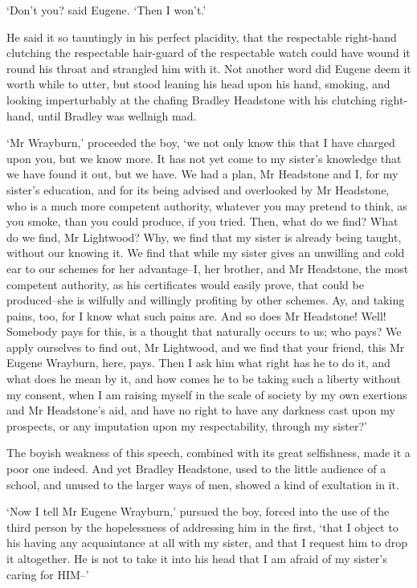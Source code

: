 ‘Don’t you? said Eugene. ‘Then I won’t.’

He said it so tauntingly in his perfect placidity, that the respectable
right-hand clutching the respectable hair-guard of the respectable watch
could have wound it round his throat and strangled him with it. Not
another word did Eugene deem it worth while to utter, but stood leaning
his head upon his hand, smoking, and looking imperturbably at the
chafing Bradley Headstone with his clutching right-hand, until Bradley
was wellnigh mad.

‘Mr Wrayburn,’ proceeded the boy, ‘we not only know this that I have
charged upon you, but we know more. It has not yet come to my sister’s
knowledge that we have found it out, but we have. We had a plan, Mr
Headstone and I, for my sister’s education, and for its being advised
and overlooked by Mr Headstone, who is a much more competent authority,
whatever you may pretend to think, as you smoke, than you could produce,
if you tried. Then, what do we find? What do we find, Mr Lightwood? Why,
we find that my sister is already being taught, without our knowing
it. We find that while my sister gives an unwilling and cold ear to our
schemes for her advantage--I, her brother, and Mr Headstone, the most
competent authority, as his certificates would easily prove, that could
be produced--she is wilfully and willingly profiting by other schemes.
Ay, and taking pains, too, for I know what such pains are. And so does
Mr Headstone! Well! Somebody pays for this, is a thought that naturally
occurs to us; who pays? We apply ourselves to find out, Mr Lightwood,
and we find that your friend, this Mr Eugene Wrayburn, here, pays. Then
I ask him what right has he to do it, and what does he mean by it, and
how comes he to be taking such a liberty without my consent, when I
am raising myself in the scale of society by my own exertions and Mr
Headstone’s aid, and have no right to have any darkness cast upon my
prospects, or any imputation upon my respectability, through my sister?’

The boyish weakness of this speech, combined with its great selfishness,
made it a poor one indeed. And yet Bradley Headstone, used to the little
audience of a school, and unused to the larger ways of men, showed a
kind of exultation in it.

‘Now I tell Mr Eugene Wrayburn,’ pursued the boy, forced into the use
of the third person by the hopelessness of addressing him in the first,
‘that I object to his having any acquaintance at all with my sister, and
that I request him to drop it altogether. He is not to take it into his
head that I am afraid of my sister’s caring for HIM--’

